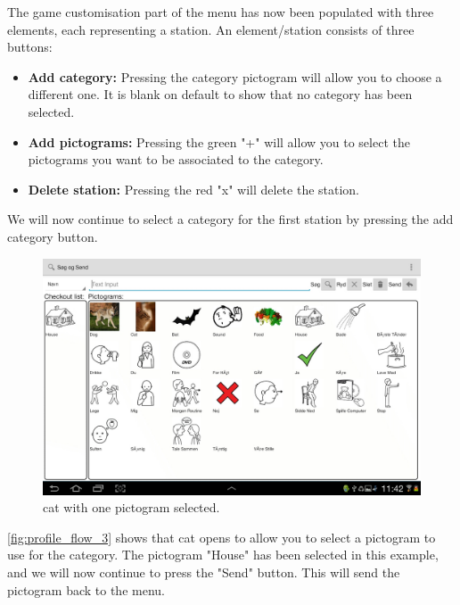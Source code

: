 The game customisation part of the menu has now been populated with three elements, each representing a station. An element/station consists of three buttons:
\begin{itemize}
\item \textbf{Add category:} Pressing the category pictogram will allow you to choose a different one. It is blank on default to show that no category has been selected.
\item \textbf{Add pictograms:} Pressing the green "+" will allow you to select the pictograms you want to be associated to the category.
\item \textbf{Delete station:} Pressing the red "x" will delete the station.
\end{itemize}
We will now continue to select a category for the first station by pressing the add category button.

\begin{figure}[H]
\centering
\includegraphics[width=1.0\linewidth]{img/screenshots/profile_flow_3.jpg}%
\caption{\ac{cat} with one pictogram selected.}
\label{fig:profile_flow_3}
\end{figure}

\autoref{fig:profile_flow_3} shows that \ac{cat} opens to allow you to select a pictogram to use for the category.
The pictogram "House" has been selected in this example, and we will now continue to press the "Send" button. This will send the pictogram back to the menu.

